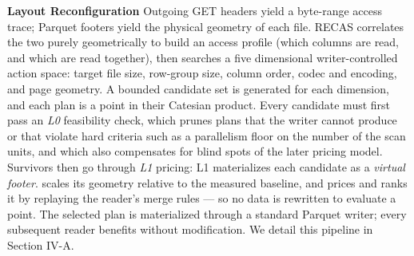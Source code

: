 \textbf{Layout Reconfiguration} Outgoing GET headers yield a byte-range access trace; Parquet footers yield the physical geometry of each file. RECAS correlates the two purely geometrically to build an access profile (which columns are read, and which are read together), then searches a five dimensional writer-controlled action space: target file size, row-group size, column order, codec and encoding, and page geometry. A bounded candidate set is generated for each dimension, and each plan is a point in their Catesian product. Every candidate must first pass an \textit{L0} feasibility check, which prunes plans that the writer cannot produce or that violate hard criteria such as a parallelism floor on the number of the scan units, and which also compensates for blind spots of the later pricing model. %
Survivors then go through \emph{L1} pricing: L1 materializes each candidate as a \emph{virtual footer}. scales its geometry relative to the measured baseline, and prices and ranks it by replaying the reader's merge rules --- so no data is rewritten to evaluate a point. The selected plan is materialized through a standard Parquet writer; every subsequent reader benefits without modification. We detail this pipeline in Section IV-A. 

